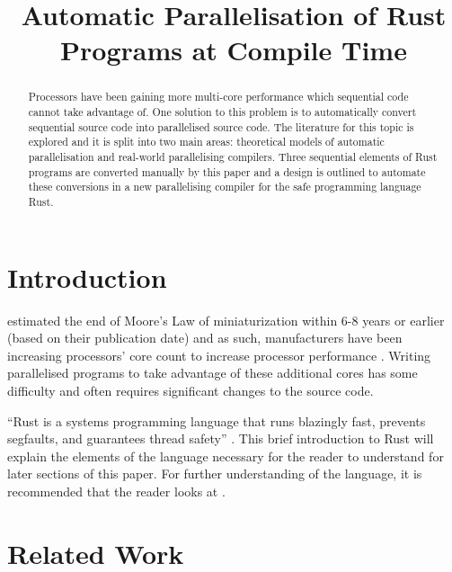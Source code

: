 \documentclass[conference]{IEEEtran}
\begin{document}
\title{Automatic Parallelisation of Rust Programs at Compile Time}

\author{
\and
{}
}

\maketitle

\begin{abstract}
  Processors have been gaining more multi-core performance which sequential code cannot take advantage of. One solution to this problem is to automatically convert sequential source code into parallelised source code. The literature for this topic is explored and it is split into two main areas: theoretical models of automatic parallelisation and real-world parallelising compilers. Three sequential elements of Rust programs are converted manually by this paper and a design is outlined to automate these conversions in a new parallelising compiler for the safe programming language Rust.
\end{abstract}

\section{Introduction}
\textcite{Kish2002} estimated the end of Moore's Law of miniaturization within 6-8 years or earlier (based on their publication date) and as such, manufacturers have been increasing processors' core count to increase processor performance \parencite{Geer2005}. Writing parallelised programs to take advantage of these additional cores has some difficulty and often requires significant changes to the source code.


``Rust is a systems programming language that runs blazingly fast, prevents segfaults, and guarantees thread safety'' \parencite{rustlang}. This brief introduction to Rust will explain the elements of the language necessary for the reader to understand for later sections of this paper. For further understanding of the language, it is recommended that the reader looks at \textcite{rustbook}.


\section{Related Work}
\end{document}

